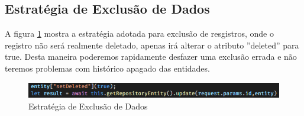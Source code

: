 \subsection{Estratégia de Exclusão de Dados}

A figura \ref{code_server_delete-strategy} mostra a estratégia adotada para exclusão de resgistros, onde o registro não será realmente deletado, apenas irá alterar o atributo ''deleted'' para true. Desta maneira poderemos rapidamente desfazer uma exclusão errada e não teremos problemas com histórico apagado das entidades.

\begin{figure}[htb]
	\caption{\label{code_server_delete-strategy}Estratégia de Exclusão de Dados}
	\begin{center}
		\includegraphics[scale=0.90]{./Figuras/code/server/delete-strategy.png}
	\end{center}
\end{figure}


